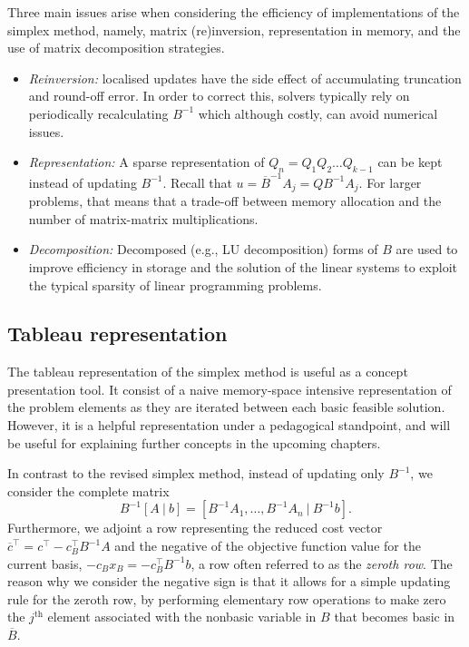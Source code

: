Three main issues arise when considering the efficiency of implementations of the simplex method, namely, matrix (re)inversion, representation in memory, and the use of matrix decomposition strategies.
%
\begin{itemize}
	\item \emph{Reinversion:} localised updates have the side effect of accumulating truncation and round-off error. In order to correct this, solvers typically rely on periodically recalculating $B^{-1}$ which although costly, can avoid numerical issues.
	\item \emph{Representation:} A sparse representation of $Q_n = Q_1Q_2 \dots Q_{k-1}$ can be kept instead of updating $B^{-1}$. Recall that $u = \overline{B}^{-1}A_j = QB^{-1}A_j$. For larger problems, that means that a trade-off between memory allocation and the number of matrix-matrix multiplications.
	\item \emph{Decomposition:} Decomposed (e.g., LU decomposition) forms of $B$ are used to improve efficiency in storage and the solution of the linear systems to exploit the typical sparsity of linear programming problems.  	
\end{itemize}



\subsection{Tableau representation}

The tableau representation of the simplex method is useful as a concept presentation tool. It consist of a naive memory-space intensive representation of the problem elements as they are iterated between each basic feasible solution. However, it is a helpful representation under a pedagogical standpoint, and will be useful for explaining further concepts in the upcoming chapters. 

In contrast to the revised simplex method, instead of updating only $B^{-1}$, we consider the complete matrix 
%
\begin{equation*}
	B^{-1}[A ~|~ b] = \left[B^{-1}A_1, \dots, B^{-1}A_n ~|~  B^{-1}b\right].		
\end{equation*}
%
Furthermore, we adjoint a row representing the reduced cost vector $\overline{c}^\top = c^\top - c_B^\top B^{-1}A$ and the negative of the objective function value for the current basis, $ -c_Bx_B = -c_B^\top B^{-1}b$, a row often referred to as the \emph{zeroth row}. The reason why we consider the negative sign is that it allows for a simple updating rule for the zeroth row, by performing elementary row operations to make zero the $j^\text{th}$ element associated with the nonbasic variable in $B$ that becomes basic in $\overline{B}$.

